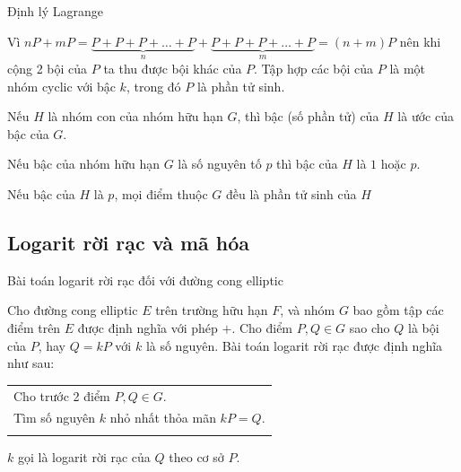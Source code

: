 \documentclass [xcolor=svgnames, t] {beamer}
\theoremstyle{definition}
\begin{document}
\begin{frame}{Định lý Lagrange}
    \begin{corollary}
        Vì $nP + mP = \underbrace{P+P+P+\ldots+P}_{n} + \underbrace{P+P+P+\ldots+P}_{m} = (n+m)P$
        nên khi cộng 2 bội của $P$ ta thu được bội khác của $P$. Tập hợp các bội của $P$ là một nhóm cyclic với bậc $k$, trong đó $P$ là phần tử sinh.
    \end{corollary}
    \begin{theorem}
        Nếu $H$ là nhóm con của nhóm hữu hạn $G$, thì bậc (số phần tử) của $H$ là ước của bậc của $G$.
    \end{theorem}
    \begin{corollary}
        Nếu bậc của nhóm hữu hạn $G$ là số nguyên tố $p$ thì bậc của  $H$ là $1$ hoặc $p$.

        Nếu bậc của $H$ là $p$, mọi điểm thuộc $G$ đều là phần tử sinh của $H$
    \end{corollary}
\end{frame}
\subsection{Logarit rời rạc và mã hóa}
\begin{frame}{Bài toán logarit rời rạc đối với đường cong elliptic}
    \begin{definition}
        \label{define:3.1}
        Cho đường cong elliptic $E$ trên trường hữu hạn $F$, và nhóm $G$ bao gồm tập các điểm trên $E$ được định nghĩa với phép $+$. Cho điểm
        $P, Q \in G$ sao cho $Q$ là bội của $P$, hay $Q = kP$ với $k$ là số nguyên. Bài toán logarit rời rạc được định nghĩa như sau:

        \begin{tabular}{l}
            \\
            Cho trước 2 điểm $P, Q \in G$.                \\
            Tìm số nguyên $k$ nhỏ nhất thỏa mãn $kP = Q$. \\
            \\
        \end{tabular}

        $k$ gọi là logarit rời rạc của $Q$ theo cơ sở $P$.

    \end{definition}
\end{frame}
\end{document}
